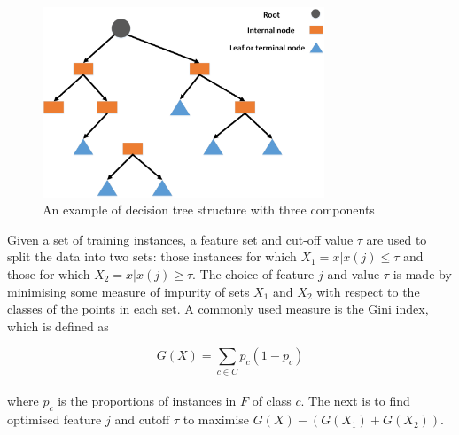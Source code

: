 \begin{figure}[htb!]
\centering
\includegraphics[width=0.75\textwidth]{image/Method/DT.png}
\caption[A DT classifier]{An example of decision tree structure with three components}
\label{fig:DT}
\end{figure}

Given a set of training instances, a feature set and cut-off value $\tau$ are used to split the data into two sets: those instances for which $X_{1}={x|x(j) \leq \tau}$ and those for which $X_{2}={x|x(j) \geq \tau}$. The choice of feature $j$ and value $\tau$ is made by minimising some measure of impurity of sets $X_{1}$ and $X_{2}$ with respect to the classes of the points in each set. A commonly used measure is the Gini index, which is defined as 

\begin{equation}
G(X)=\sum_{c \in C}p_{c}(1-p_{c})
\end{equation}
\\
where $p_{c}$ is the proportions of instances in $F$ of class $c$. The next is to find optimised feature $j$ and cutoff $\tau$ to maximise 
$G(X)-(G(X_1 )+G(X_2))$. 

